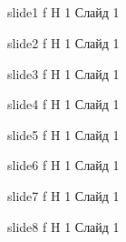 \begin{appendices}
	\chapter{}
	
	{slide1} %
	{f} %
	{H} %
	{1\textwidth} %
	{Слайд 1} %
	
	{slide2} %
	{f} %
	{H} %
	{1\textwidth} %
	{Слайд 1} %
	
	{slide3} %
	{f} %
	{H} %
	{1\textwidth} %
	{Слайд 1} %
	
	{slide4} %
	{f} %
	{H} %
	{1\textwidth} %
	{Слайд 1} %
	
	{slide5} %
	{f} %
	{H} %
	{1\textwidth} %
	{Слайд 1} %
	
	{slide6} %
	{f} %
	{H} %
	{1\textwidth} %
	{Слайд 1} %
	
	{slide7} %
	{f} %
	{H} %
	{1\textwidth} %
	{Слайд 1} %
	
	{slide8} %
	{f} %
	{H} %
	{1\textwidth} %
	{Слайд 1} %
	

\end{appendices}
